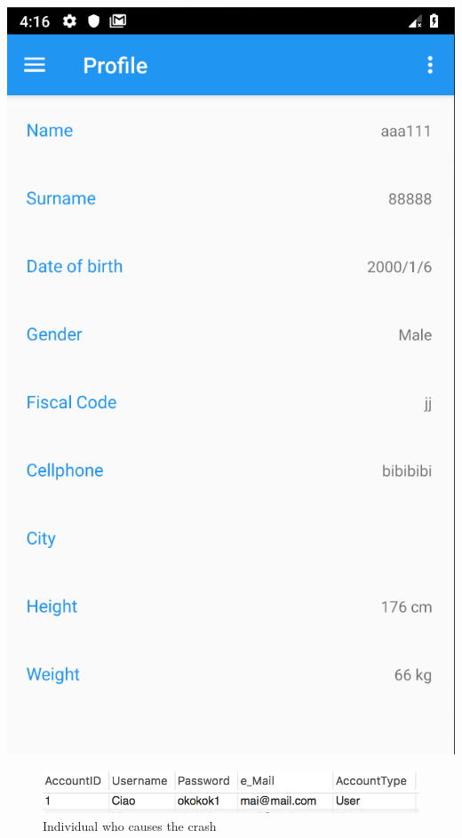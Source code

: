 \begin{center}
   \includegraphics[scale=0.7]{resources/profilebug.png}
\end{center}

\begin{figure}
\centering
\includegraphics[scale=0.8]{resources/individual_crash}
\caption{Individual who causes the crash}\label{fig:indiv_crash}
\end{figure}



